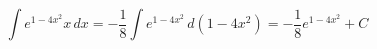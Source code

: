 \documentclass[../rgr1.tex]{subfiles}
\begin{document}
\Solution

\begin{equation}
	\int e^{1 - 4x^2} x\, dx =
	- \frac{1}{8} \int e^{1 - 4x^2} \, d(1-4x^2) =
	- \frac{1}{8} e^{1-4x^2} + C
\end{equation}

\end{document}
